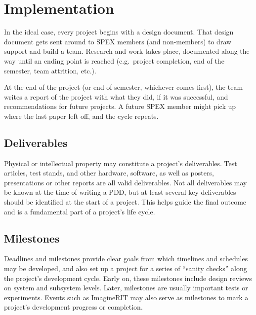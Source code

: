 \documentclass[conference]{IEEEtran} %
\begin{document}
\section{Implementation}
\label{sec:implementation}

In the ideal case, every project begins with a design document.
That design document gets sent around to SPEX members (and non-members) to draw support and build a team.
Research and work takes place, documented along the way until  an ending point is reached (e.g.\ project completion, end of the semester, team attrition, etc.).

At the end of the project (or end of semester, whichever comes first), the team writes a report of the project with what they did, if it was successful, and recommendations for future projects.
A future SPEX member might pick up where the last paper left off, and the cycle repeats.

\subsection{Deliverables}
\label{subsec:deliverables}
Physical or intellectual property may constitute a project's deliverables.
Test articles, test stands, and other hardware, software, as well as posters, presentations or other reports are all valid deliverables.
Not all deliverables may be known at the time of writing a PDD, but at least several key deliverables should be identified at the start of a project.
This helps guide the final outcome and is a fundamental part of a project's life cycle.

\subsection{Milestones}
\label{subsec:milestones}
Deadlines and milestones provide clear goals from which timelines and schedules may be developed, and also set up a project for a series of ``sanity checks'' along the project's development cycle.
Early on, these milestones include design reviews on system and subsystem levels.
Later, milestones are usually important tests or experiments.
Events such as ImagineRIT may also serve as milestones to mark a project's development progress or completion.
\end{document}
